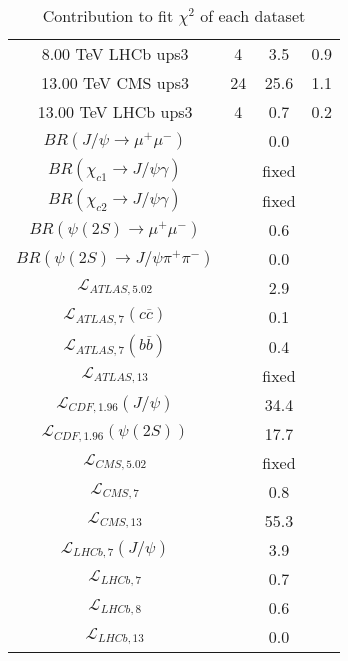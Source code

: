 \begin{table}[h!]
\begin{tabular}{c|c|c|c}
8.00 TeV LHCb ups3 & 4 & 3.5 & 0.9 \\
13.00 TeV CMS ups3 & 24 & 25.6 & 1.1 \\
13.00 TeV LHCb ups3 & 4 & 0.7 & 0.2 \\
\hline
$BR(J/\psi\rightarrow\mu^+\mu^-)$ &  & 0.0 &  \\
$BR(\chi_{c1}\rightarrow J/\psi\gamma)$ &  & fixed & \\
$BR(\chi_{c2}\rightarrow J/\psi\gamma)$ &  & fixed & \\
$BR(\psi(2S)\rightarrow\mu^+\mu^-)$ &  & 0.6 &  \\
$BR(\psi(2S)\rightarrow J/\psi\pi^+\pi^-)$ &  & 0.0 &  \\
$\mathcal L_{ATLAS,5.02}$ &  & 2.9 &  \\
$\mathcal L_{ATLAS,7}(c\overline c)$ &  & 0.1 &  \\
$\mathcal L_{ATLAS,7}(b\overline b)$ &  & 0.4 &  \\
$\mathcal L_{ATLAS,13}$ &  & fixed & \\
$\mathcal L_{CDF,1.96}(J/\psi)$ &  & 34.4 &  \\
$\mathcal L_{CDF,1.96}(\psi(2S))$ &  & 17.7 &  \\
$\mathcal L_{CMS,5.02}$ &  & fixed & \\
$\mathcal L_{CMS,7}$ &  & 0.8 &  \\
$\mathcal L_{CMS,13}$ &  & 55.3 &  \\
$\mathcal L_{LHCb,7}(J/\psi)$ &  & 3.9 &  \\
$\mathcal L_{LHCb,7}$ &  & 0.7 &  \\
$\mathcal L_{LHCb,8}$ &  & 0.6 &  \\
$\mathcal L_{LHCb,13}$ &  & 0.0 &  \\
\end{tabular}
\caption{Contribution to fit $\chi^2$ of each dataset}
\end{table}
